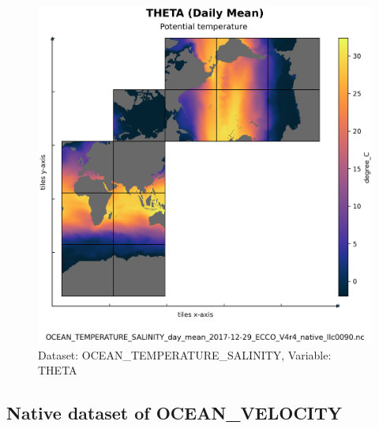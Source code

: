 \begin{figure}[H]
\centering
\includegraphics[scale=0.55]{../images/plots/native_plots/Ocean_Temperature_and_Salinity/THETA.png}
\caption{Dataset: OCEAN\_TEMPERATURE\_SALINITY, Variable: THETA}
\label{tab:table-OCEAN_TEMPERATURE_SALINITY_THETA-Plot}
\end{figure}
\subsection{Native dataset of OCEAN\_VELOCITY}
\newp
